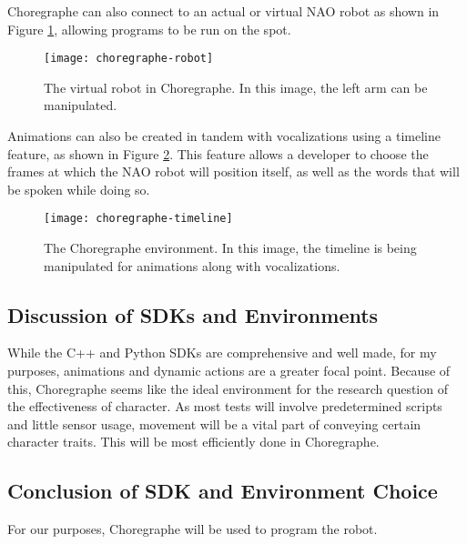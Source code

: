 Choregraphe can also connect to an actual or virtual NAO robot as shown in Figure \ref{fig:choregraphe-robot}, allowing programs to be run on the spot.

\begin{figure}[H]
	\centering
	\texttt{[image: choregraphe-robot]}
	\caption{The virtual robot in Choregraphe. In this image, the left arm can be manipulated.}
	\label{fig:choregraphe-robot}
\end{figure}

Animations can also be created in tandem with vocalizations using a timeline feature, as shown in Figure \ref{fig:choregraphe-timeline}. This feature allows a developer to choose the frames at which the NAO robot will position itself, as well as the words that will be spoken while doing so. \cite{NAOSDK:Choregraphe}

\begin{figure}[H]
	\centering
	\texttt{[image: choregraphe-timeline]}
	\caption{The Choregraphe environment. In this image, the timeline is being manipulated for animations along with vocalizations.}
	\label{fig:choregraphe-timeline}
\end{figure}

\subsection{Discussion of SDKs and Environments}
While the C++ and Python SDKs are comprehensive and well made, for my purposes, animations and dynamic actions are a greater focal point.
Because of this, Choregraphe seems like the ideal environment for the research question of the effectiveness of character.
As most tests will involve predetermined scripts and little sensor usage, movement will be a vital part of conveying certain character traits. This will be most efficiently done in Choregraphe.

\subsection{Conclusion of SDK and Environment Choice}
For our purposes, Choregraphe will be used to program the robot.
